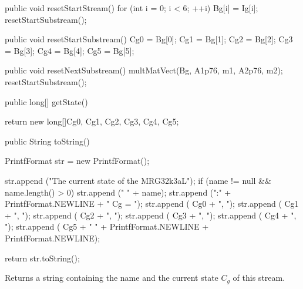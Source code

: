 \fi
\begin{htmlonly}
\end{htmlonly}
\begin{code}
\begin{hide}
   public void resetStartStream()  {
      for (int i = 0; i < 6;  ++i)
         Bg[i] = Ig[i];
      resetStartSubstream();
   }

   public void resetStartSubstream()  {
      Cg0 = Bg[0];
      Cg1 = Bg[1];
      Cg2 = Bg[2];
      Cg3 = Bg[3];
      Cg4 = Bg[4];
      Cg5 = Bg[5];
   }

   public void resetNextSubstream()  {
      multMatVect(Bg, A1p76, m1, A2p76, m2);
      resetStartSubstream();
   }

\end{hide}
   public long[] getState() \begin{hide} {
      return new long[]{Cg0, Cg1, Cg2, Cg3, Cg4, Cg5};
   } \end{hide}
\end{code}
\iffalse
 \begin{tabb} Returns the current state $C_g$ of this stream.
  This is a vector of 6 integers represented in floating-point format.
  This method is convenient if we want to save the state for
  subsequent use.
 \end{tabb}
\fi
\begin{htmlonly}
\end{htmlonly}
\begin{code}

   public String toString() \begin{hide} {
      PrintfFormat str = new PrintfFormat();

      str.append ("The current state of the MRG32k3aL");
      if (name != null && name.length() > 0)
         str.append (" " + name);
      str.append (":" + PrintfFormat.NEWLINE + "   Cg = { ");
      str.append ( Cg0 + ", ");
      str.append ( Cg1 + ", ");
      str.append ( Cg2 + ", ");
      str.append ( Cg3 + ", ");
      str.append ( Cg4 + ", ");
      str.append ( Cg5 + " }" + PrintfFormat.NEWLINE +
           PrintfFormat.NEWLINE);

      return str.toString();
   }\end{hide}
\end{code}
\iffalse
 \begin{tabb} Returns a string containing the name and the current state $C_g$
   of this stream.
 \end{tabb}

